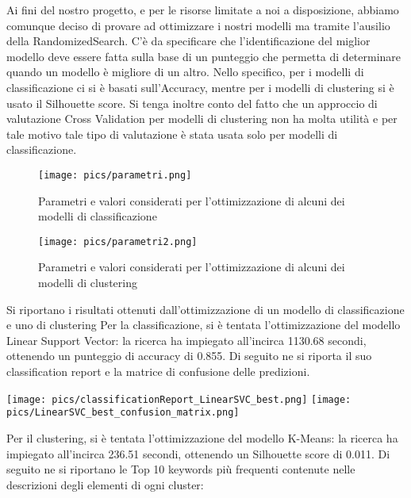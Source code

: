 \documentclass[12pt,oneside]{article}
\begin{document}
\begin{justify}
        Ai fini del nostro progetto, e per le risorse limitate a noi a disposizione, abbiamo comunque deciso di provare ad ottimizzare i nostri modelli ma tramite l’ausilio della RandomizedSearch. C’è da specificare che l’identificazione del miglior modello deve essere fatta sulla base di un punteggio che permetta di determinare quando un modello è migliore di un altro. Nello specifico, per i modelli di classificazione ci si è basati sull’Accuracy, mentre per i modelli di clustering si è usato il Silhouette score. Si tenga inoltre conto del fatto che un approccio di valutazione Cross Validation per modelli di clustering non ha molta utilità e per tale motivo tale tipo di valutazione è stata usata solo per modelli di classificazione.
        \end{justify}

        \begin{figure}[H]
        \texttt{[image: pics/parametri.png]}
        \caption{Parametri e valori considerati per l’ottimizzazione di alcuni dei modelli di classificazione}
        \end{figure}

        \begin{figure}[H]
        \texttt{[image: pics/parametri2.png]}
        \caption{Parametri e valori considerati per l’ottimizzazione di alcuni dei modelli di clustering}
        \end{figure}
        
        \begin{justify}
        Si riportano i risultati ottenuti dall’ottimizzazione di un modello di classificazione e uno di clustering
        Per la classificazione, si è tentata l’ottimizzazione del modello Linear Support Vector: la ricerca ha impiegato all’incirca 1130.68 secondi, ottenendo un punteggio di accuracy di 0.855. Di seguito ne si riporta il suo classification report e la matrice di confusione delle predizioni.
        \end{justify}

        \texttt{[image: pics/classificationReport\_LinearSVC\_best.png]}
        \texttt{[image: pics/LinearSVC\_best\_confusion\_matrix.png]}
        
        \begin{justify}
        Per il clustering, si è tentata l’ottimizzazione del modello K-Means: la ricerca ha impiegato all’incirca 236.51 secondi, ottenendo un Silhouette score di 0.011. Di seguito ne si riportano le Top 10 keywords più frequenti contenute nelle descrizioni degli elementi di ogni cluster:
        \end{justify}
\end{document}
